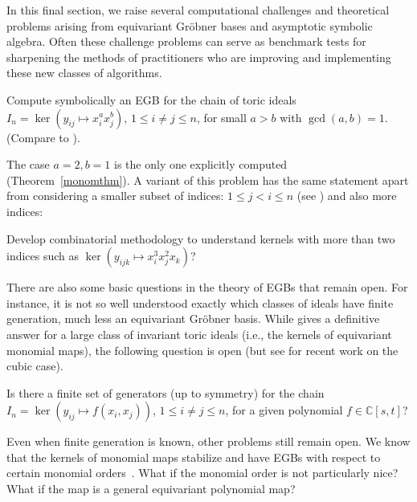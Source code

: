 
In this final section, we raise several computational challenges and theoretical problems arising from equivariant Gr\"obner bases and asymptotic symbolic algebra.  Often these challenge problems can serve as benchmark tests for sharpening the methods of practitioners who are improving and implementing these new classes of algorithms.

\begin{problem}
Compute symbolically an EGB for the chain of toric ideals $I_n = \ker(y_{ij} \mapsto x_i^a x_j^b)$, $1 \leq i \neq j \leq n$, for small $a>b$ with $\gcd(a,b)=1$. (Compare to \cite{Hillar13, hillar2016corrigendum, KKL:equivariant-markov, draisma2013noetherianity, Krone:egb-toric}).
\end{problem}

The case $a=2,b=1$ is the only one explicitly computed (Theorem~\ref{monomthm}). A variant of this problem has the same statement apart from considering a smaller subset of indices: $1 \leq j < i \leq n$ (see \cite[Remark 6.3]{draisma2013noetherianity}) and also more indices:

\begin{problem}
Develop combinatorial methodology to understand kernels with more than two indices such as $\ker(y_{ijk} \mapsto x_i^3 x_j^2 x_k)$?  
\end{problem}

There are also some basic questions in the theory of EGBs that remain open.  For instance, it is not so well understood exactly which classes of ideals have finite generation, much less an equivariant Gr\"obner basis. 
While \cite{draisma2013noetherianity} gives a definitive answer for a large class of invariant toric ideals (i.e., the kernels of equivariant monomial maps), the following question is open (but see \cite{eggermont17} for recent work on the cubic case).
\begin{question}
Is there a finite set of generators (up to symmetry) for the chain $I_n = \ker(y_{ij} \mapsto f(x_i,x_j))$, $1 \leq i \neq j \leq n$, for a given polynomial $f \in \mathbb C[s,t]$?  
\end{question}

Even when finite generation is known, other problems still remain open.  
 We know that the kernels of monomial maps stabilize \cite{aschenbrenner2007finite, KKL:equivariant-markov, draisma2013noetherianity} and have EGBs with respect to certain monomial orders~\cite{Krone:egb-toric}. What if the monomial order is not particularly nice? What if the map is a general equivariant polynomial map?

